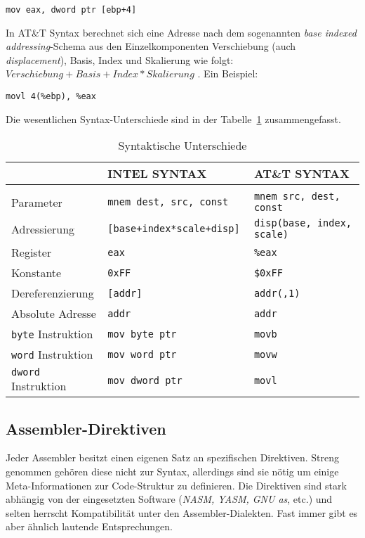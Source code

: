 \hspace{5mm} 
\texttt{mov eax, dword ptr [ebp+4]}

In AT\&T Syntax berechnet sich eine Adresse nach dem sogenannten \emph{base
indexed addressing}-Schema aus den Einzelkomponenten Verschiebung (auch
\emph{displacement}), Basis, Index und Skalierung wie folgt: $Verschiebung + Basis +
Index*Skalierung$ . Ein Beispiel:

\hspace{5mm} 
\texttt{movl 4(\%ebp), \%eax}

Die wesentlichen Syntax-Unterschiede sind in der Tabelle~\ref{tab:syntaxdiffs}
zusammengefasst.


\begin{table}[ht]  %
\begin{tabular}{lll}
\\                            & INTEL SYNTAX                  & AT\&T SYNTAX
\\\hline
\\  Parameter                 & \tt mnem dest, src, const     & \tt mnem src, dest, const
\\  Adressierung              & \tt [base+index*scale+disp]   & \tt disp(base, index, scale)
\\  Register                  & \tt eax                       & \tt \%eax
\\  Konstante                 & \tt 0xFF                      & \tt \$0xFF
\\  Dereferenzierung          & \tt [addr]                    & \tt addr(,1)
\\  Absolute Adresse          & \tt addr                      & \tt *addr
\\  {\tt byte} Instruktion    & \tt mov byte ptr              & \tt movb
\\  {\tt word} Instruktion    & \tt mov word ptr              & \tt movw
\\  {\tt dword} Instruktion   & \tt mov dword ptr             & \tt movl
\end{tabular}
\caption{Syntaktische Unterschiede} \label{tab:syntaxdiffs}
\end{table}

\subsection{Assembler-Direktiven}
Jeder Assembler besitzt einen eigenen Satz an spezifischen Direktiven. Streng
genommen gehören diese nicht zur Syntax, allerdings sind sie nötig um einige
Meta-Informationen zur Code-Struktur zu definieren. Die Direktiven sind stark
abhängig von der eingesetzten Software (\emph{NASM, YASM, GNU as}, etc.) und selten
herrscht Kompatibilität unter den Assembler-Dialekten. Fast immer gibt es aber ähnlich lautende Entsprechungen.

